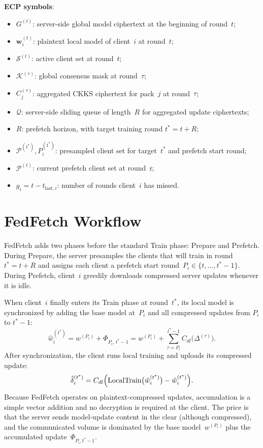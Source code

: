 \documentclass[conference]{IEEEtran}
\begin{document}
\textbf{ECP symbols}:
\begin{itemize}
    \item $G^{(t)}$: server-side global model ciphertext at the beginning of round~$t$;
    \item $\mathbf{w}_i^{(t)}$: plaintext local model of client~$i$ at round~$t$;
    \item $\mathcal{S}^{(t)}$: active client set at round~$t$;
    \item $\mathcal{K}^{(\tau)}$: global consensus mask at round~$\tau$;
    \item $C_j^{(\tau)}$: aggregated CKKS ciphertext for pack~$j$ at round~$\tau$;
    \item $\mathcal{Q}$: server-side sliding queue of length~$R$ for aggregated update ciphertexts;
    \item $R$: prefetch horizon, with target training round $t^*=t+R$;
    \item $\mathcal{P}^{(t^*)}, P_i^{(t^*)}$: presampled client set for target~$t^*$ and prefetch start round;
    \item $\mathcal{P}^{(t)}$: current prefetch client set at round~$t$;
    \item $g_i=t-t_{\mathrm{last},i}$: number of rounds client~$i$ has missed.
\end{itemize}

\section{FedFetch Workflow}

FedFetch adds two phases before the standard Train phase: Prepare and Prefetch.
During Prepare, the server presamples the clients that will train in round~$t^*=t+R$ and assigns each client a prefetch start round~$P_i\in\{t,\dots,t^*-1\}$.
During Prefetch, client~$i$ greedily downloads compressed server updates whenever it is idle.

When client~$i$ finally enters its Train phase at round~$t^*$, its local model is synchronized by adding the base model at~$P_i$ and all compressed updates from $P_i$ to $t^*-1$:
\begin{equation}
    \hat{w}_i^{(t^*)}
    = w^{(P_i)} + \Phi_{P_i,\,t^*-1}
    = w^{(P_i)} + \sum_{\tau=P_i}^{t^*-1} C_{dl}\bigl(\Delta^{(\tau)}\bigr).
    \label{eq:fedfetch-sync}
\end{equation}
After synchronization, the client runs local training and uploads its compressed update:
\begin{equation}
    \hat{\delta}_i^{(t^*)} = C_{dl}\Bigl(\mathrm{LocalTrain}\bigl(\hat{w}_i^{(t^*)}\bigr) - \hat{w}_i^{(t^*)}\Bigr).
\end{equation}
Because FedFetch operates on plaintext-compressed updates, accumulation is a simple vector addition and no decryption is required at the client.
The price is that the server sends model-update content in the clear (although compressed), and the communicated volume is dominated by the base model~$w^{(P_i)}$ plus the accumulated update~$\Phi_{P_i,t^*-1}$.
\end{document}
